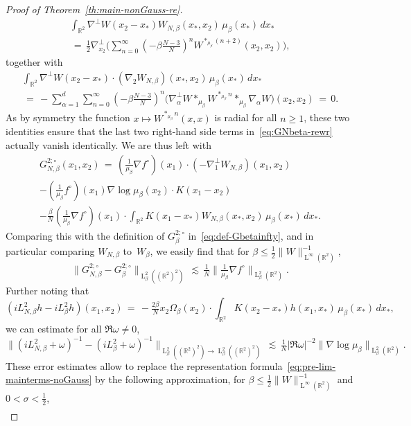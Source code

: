 \documentclass[a4paper,11pt,reqno,noindent]{amsart}
\theoremstyle{plain}
\numberwithin{equation}{section}
\newcommand{\R}{\mathbb R}
\newcommand{\3}{|\!|\!|}
\newcommand{\Ld}{\operatorname{L}}
\begin{document}
\begin{proof}[Proof of Theorem~\ref{th:main-nonGauss-re}]
\begin{multline}\label{eq:decompnabbot-Wbet}
\int_{\R^2}\nabla^\bot W(x_2-x_*)W_{N,\beta}(x_*,x_2)\,\mu_\beta(x_*)\,dx_*\\
\,=\,\tfrac12\nabla^\bot_{x_2}\Big(\sum_{n=0}^\infty(-\beta\tfrac{N-3}N)^n W^{\ast_{\mu_\beta}(n+2)}(x_2,x_2)\Big),
\end{multline}
together with
\begin{multline*}
\int_{\R^2}\nabla^\bot W(x_2-x_*)\cdot(\nabla_2W_{N,\beta})(x_*,x_2)\,\mu_\beta(x_*)\,dx_*\\
\,=\,-\sum_{\alpha=1}^d\sum_{n=0}^\infty(-\beta\tfrac{N-3}N)^n \big(\nabla^\bot_\alpha W\ast_{\mu_\beta}W^{\ast_{\mu_\beta}n}\ast_{\mu_\beta}\nabla_\alpha W\big)(x_2,x_2)\,=\,0.
\end{multline*}
As by symmetry the function $x\mapsto W^{\ast_{\mu_\beta}n}(x,x)$ is radial for all $n\ge1$, these two identities ensure that the last two right-hand side terms in~\eqref{eq:GNbeta-rewr} actually vanish identically. We are thus left with
\begin{multline*}
G_{N,\beta}^{2;\circ}(x_1,x_2)\,=\,
(\tfrac1{\mu_\beta}\nabla f^\circ)(x_1)\cdot(-\nabla^\bot_1W_{N,\beta})(x_1,x_2)\\
-(\tfrac{1}{\mu_\beta}f^\circ)(x_1)\nabla\log\mu_\beta(x_2)\cdot K(x_1-x_2)\\
-\tfrac{\beta}{N}(\tfrac{1}{\mu_\beta}\nabla f^\circ)(x_1)\cdot\int_{\R^2}K(x_1-x_*)W_{N,\beta}(x_*,x_2)\,\mu_\beta(x_*)\,dx_*.
\end{multline*}
Comparing this with the definition of $G_\beta^{2;\circ}$ in~\eqref{eq:def-Gbetainfty}, and in particular comparing $W_{N,\beta}$ to~$W_\beta$, we easily find that for $\beta\le\frac12\|W\|_{\Ld^\infty(\R^2)}^{-1}$,
\[\|G_{N,\beta}^{2;\circ}-G_\beta^{2;\circ}\|_{\Ld^2_\beta((\R^2)^2)}\,\lesssim\,\tfrac1N\|\tfrac1{\mu_\beta}\nabla f^\circ\|_{\Ld^2_\beta(\R^2)}.\]
Further noting that
\[(iL_{N,\beta}^2h-iL_\beta^2h)(x_1,x_2)\,=\,-\tfrac{2\beta}Nx_2\Omega_\beta(x_2)\cdot\int_{\R^2}K(x_2-x_*)h(x_1,x_*)\,\mu_\beta(x_*)\,dx_*,\]
we can estimate for all $\Re\omega\ne0$,
\[\big\|(iL_{N,\beta}^2+\omega)^{-1}-(iL_{\beta}^2+\omega)^{-1}\big\|_{\Ld^2_\beta((\R^2)^2)\to\Ld^2_\beta((\R^2)^2)}\,\lesssim\,\tfrac{1}{N}|\Re\omega|^{-2}\|\nabla\log\mu_\beta\|_{\Ld^2_\beta(\R^2)}.\]
These error estimates allow to replace the representation formula~\eqref{eq:pre-lim-mainterms-noGauss} by the following approximation, for $\beta\le\frac12\|W\|_{\Ld^\infty(\R^2)}^{-1}$ and $0<\sigma<\frac12$,
\begin{multline*}

\end{multline*}
\end{proof}
\end{document}
